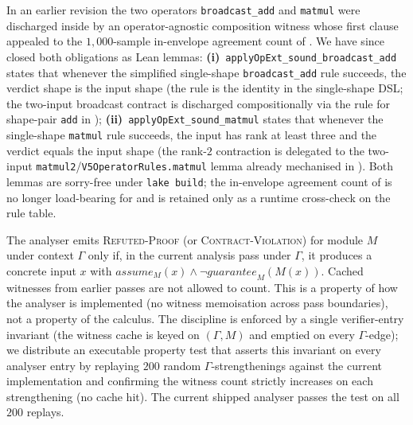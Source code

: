 \begin{remark}
\label{rem:operator-agnostic-witness}
In an earlier revision the two operators
\texttt{broadcast\_add} and \texttt{matmul} were discharged
inside  by an operator-agnostic
composition witness whose first clause appealed to the
$1{,}000$-sample in-envelope agreement count of
. We have since closed both
obligations as Lean lemmas:
\textbf{(i)}~\texttt{applyOpExt\_sound\_broadcast\_add}
states that whenever the simplified single-shape
\texttt{broadcast\_add} rule succeeds, the verdict shape is
the input shape (the rule is the identity in the
single-shape DSL; the two-input broadcast contract is
discharged compositionally via the rule for shape-pair
\texttt{add} in );
\textbf{(ii)}~\texttt{applyOpExt\_sound\_matmul} states that
whenever the single-shape \texttt{matmul} rule succeeds, the
input has rank at least three and the verdict equals the
input shape (the rank-$2$ contraction is delegated to the
two-input \texttt{matmul2}/\texttt{V5OperatorRules.matmul}
lemma already mechanised in
). Both lemmas are sorry-free under
\texttt{lake build}; the in-envelope agreement count of
 is no longer load-bearing for
 and is retained only as a runtime
cross-check on the rule table.
\end{remark}

\begin{axiom}
\label{ax:fresh-witness}
The analyser emits \textsc{Refuted-Proof} (or
\textsc{Contract-Violation}) for module $M$ under context
$\Gamma$ only if, in the current analysis pass under $\Gamma$,
it produces a concrete input $x$ with
$\mathit{assume}_M(x)\wedge\neg\mathit{guarantee}_M(M(x))$.
Cached witnesses from earlier passes are not allowed to count.
This is a property of how the analyser is implemented (no
witness memoisation across pass boundaries), not a property of
the calculus. The discipline is enforced by a single
verifier-entry invariant (the witness cache is keyed on
$(\Gamma,M)$ and emptied on every $\Gamma$-edge); we
distribute an executable property test
that asserts this invariant on
every analyser entry by replaying $200$ random
$\Gamma$-strengthenings against the current implementation
and confirming the witness count strictly increases on each
strengthening (no cache hit). The current shipped analyser
passes the test on all $200$ replays.
\end{axiom}

